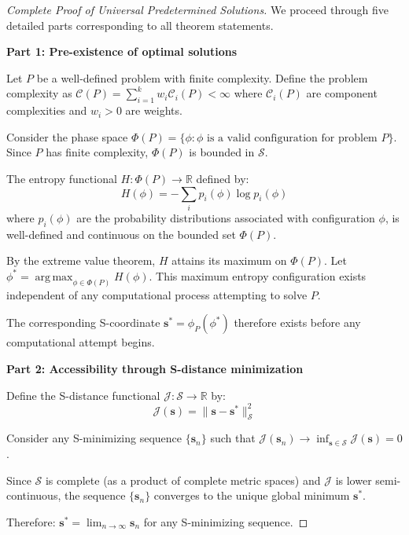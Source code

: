 \documentclass[11pt]{article}
\theoremstyle{definition}
\theoremstyle{remark}
\DeclareMathOperator{\argmax}{arg\,max}
\newcommand{\Real}{\mathbb{R}}
\newcommand{\SEntropy}{\mathcal{S}}
\begin{document}
\begin{proof}[Complete Proof of Universal Predetermined Solutions]
We proceed through five detailed parts corresponding to all theorem statements.

\textbf{Part 1: Pre-existence of optimal solutions}

Let $P$ be a well-defined problem with finite complexity. Define the problem complexity as $\mathcal{C}(P) = \sum_{i=1}^k w_i \mathcal{C}_i(P) < \infty$ where $\mathcal{C}_i(P)$ are component complexities and $w_i > 0$ are weights.

Consider the phase space $\Phi(P) = \{\phi : \phi \text{ is a valid configuration for problem } P\}$. Since $P$ has finite complexity, $\Phi(P)$ is bounded in $\SEntropy$.

The entropy functional $H: \Phi(P) \to \Real$ defined by:
\begin{equation}
H(\phi) = -\sum_{i} p_i(\phi) \log p_i(\phi)
\end{equation}
where $p_i(\phi)$ are the probability distributions associated with configuration $\phi$, is well-defined and continuous on the bounded set $\Phi(P)$.

By the extreme value theorem, $H$ attains its maximum on $\Phi(P)$. Let $\phi^* = \argmax_{\phi \in \Phi(P)} H(\phi)$. This maximum entropy configuration exists independent of any computational process attempting to solve $P$.

The corresponding S-coordinate $\mathbf{s}^* = \phi_P(\phi^*)$ therefore exists before any computational attempt begins.

\textbf{Part 2: Accessibility through S-distance minimization}

Define the S-distance functional $\mathcal{J}: \SEntropy \to \Real$ by:
\begin{equation}
\mathcal{J}(\mathbf{s}) = \|\mathbf{s} - \mathbf{s}^*\|_{\SEntropy}^2
\end{equation}

Consider any S-minimizing sequence $\{\mathbf{s}_n\}$ such that $\mathcal{J}(\mathbf{s}_n) \to \inf_{\mathbf{s} \in \SEntropy} \mathcal{J}(\mathbf{s}) = 0$.

Since $\SEntropy$ is complete (as a product of complete metric spaces) and $\mathcal{J}$ is lower semi-continuous, the sequence $\{\mathbf{s}_n\}$ converges to the unique global minimum $\mathbf{s}^*$.

Therefore: $\mathbf{s}^* = \lim_{n \to \infty} \mathbf{s}_n$ for any S-minimizing sequence.


\end{proof}
\end{document}
